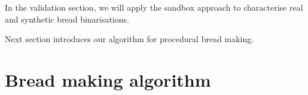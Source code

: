 \documentclass[final,5p,times]{elsarticle}
\begin{document}
{%


In the validation section, we will apply the sandbox approach to characterise real and synthetic bread binarisations.

Next section introduces our algorithm for procedural bread making.

\section{Bread making algorithm}

}
\end{document}
